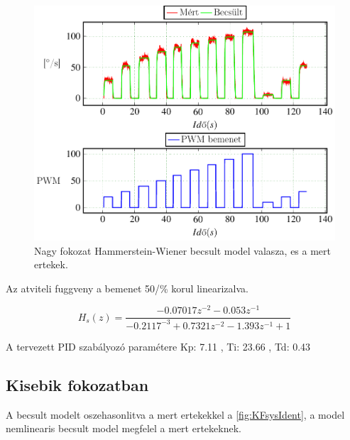 \begin{figure}[H]
  \includegraphics{tikz/NFsysIdent.pdf}
  \caption{Nagy fokozat Hammerstein-Wiener becsult model valasza, es a mert ertekek.}
  \label{fig:NFsysIdent}
\end{figure}


Az atviteli fuggveny a bemenet 50/\% korul linearizalva.

\begin{equation}
    H_s(z)=\frac{-0.07017z^{-2} -0.053z^{-1}}{-0.2117^{-3}+0.7321z^{-2} -1.393z^{-1} +1}
\end{equation}

A tervezett PID szabályozó paramétere Kp: 7.11 , Ti: 23.66 , Td: 0.43

\subsection{Kisebik fokozatban}

A becsult modelt oszehasonlitva a mert ertekekkel a \ref{fig:KFsysIdent}, a model nemlinearis becsult model megfelel a mert ertekeknek.


